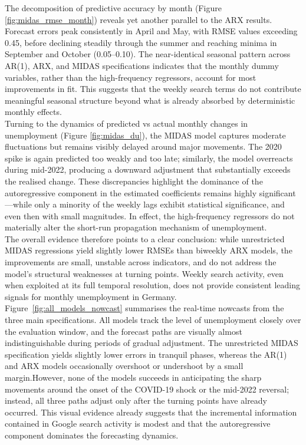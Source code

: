\documentclass[12pt,a4paper]{article}
\begin{document}
The decomposition of predictive accuracy by month (Figure \ref{fig:midas_rmse_month}) reveals yet another parallel to the ARX results. Forecast errors peak consistently in April and May, with RMSE values exceeding 0.45, before declining steadily through the summer and reaching minima in September and October (0.05–0.10). The near-identical seasonal pattern across AR(1), ARX, and MIDAS specifications indicates that the monthly dummy variables, rather than the high-frequency regressors, account for most improvements in fit. This suggests that the weekly search terms do not contribute meaningful seasonal structure beyond what is already absorbed by deterministic monthly effects.\\
Turning to the dynamics of predicted vs actual monthly changes in unemployment (Figure \ref{fig:midas_du}), the MIDAS model captures moderate fluctuations but remains visibly delayed around major movements. The 2020 spike is again predicted too weakly and too late; similarly, the model overreacts during mid-2022, producing a downward adjustment that substantially exceeds the realised change. These discrepancies highlight the dominance of the autoregressive component in the estimated coefficients
 remains highly significant—while only a minority of the weekly lags exhibit statistical significance, and even then with small magnitudes. In effect, the high-frequency regressors do not materially alter the short-run propagation mechanism of unemployment.\\
The overall evidence therefore points to a clear conclusion: while unrestricted MIDAS regressions yield slightly lower RMSEs than biweekly ARX models, the improvements are small, unstable across indicators, and do not address the model’s structural weaknesses at turning points. Weekly search activity, even when exploited at its full temporal resolution, does not provide consistent leading signals for monthly unemployment in Germany.\\
Figure~\ref{fig:all_models_nowcast} summarises the real-time nowcasts from the three main specifications. All models track the level of unemployment closely over the evaluation window, and the forecast paths are visually almost indistinguishable during periods of gradual adjustment.
The unrestricted MIDAS specification yields slightly lower errors in tranquil phases, whereas the AR(1) and ARX models occasionally overshoot or undershoot by a small margin.However, none of the models succeeds in anticipating the sharp movements around the onset of the COVID-19 shock or the mid-2022 reversal; instead, all three paths adjust only after the turning points have already occurred. This visual evidence already suggests that the incremental information contained in Google search activity is modest and that the autoregressive component dominates the forecasting dynamics.
\end{document}
